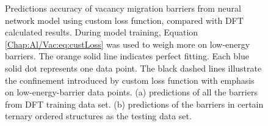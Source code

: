 \begingroup
\begin{figure}[!ht]
  \centering
\caption[Predictions accuracy of vacancy migration barriers from neural network model using custom loss function, compared with DFT calculated results.]{Predictions accuracy of vacancy migration barriers from neural network model using custom loss function, compared with DFT calculated results. During model training, Equation \ref{Chap:Al/Vac:eq:custLoss} was used to weigh more on low-energy barriers. The orange solid line indicates perfect fitting. Each blue solid dot represents one data point. The black dashed lines illustrate the confinement introduced by custom loss function with emphasis on low-energy-barrier data points. (a) predictions of all the barriers from DFT training data set. (b) predictions of the barriers in certain ternary ordered structures as the testing data set.}
\label{Chap:Al/Vac:fig:fitting_all_weighted}
\end{figure}
\endgroup

